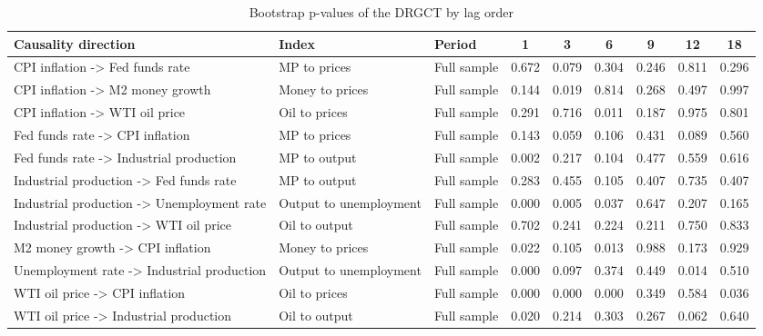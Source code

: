 \begin{table}[htbp]
\centering
\caption{Bootstrap p-values of the DRGCT by lag order}
\label{tab:macropvals}
\small
\begin{tabular}{lllcccccc}
\toprule
Causality direction & Index & Period & 1 & 3 & 6 & 9 & 12 & 18 \\
\midrule
CPI inflation -> Fed funds rate & MP to prices & Full sample & 0.672 & 0.079 & 0.304 & 0.246 & 0.811 & 0.296 \\
CPI inflation -> M2 money growth & Money to prices & Full sample & 0.144 & 0.019 & 0.814 & 0.268 & 0.497 & 0.997 \\
CPI inflation -> WTI oil price & Oil to prices & Full sample & 0.291 & 0.716 & 0.011 & 0.187 & 0.975 & 0.801 \\
Fed funds rate -> CPI inflation & MP to prices & Full sample & 0.143 & 0.059 & 0.106 & 0.431 & 0.089 & 0.560 \\
Fed funds rate -> Industrial production & MP to output & Full sample & 0.002 & 0.217 & 0.104 & 0.477 & 0.559 & 0.616 \\
Industrial production -> Fed funds rate & MP to output & Full sample & 0.283 & 0.455 & 0.105 & 0.407 & 0.735 & 0.407 \\
Industrial production -> Unemployment rate & Output to unemployment & Full sample & 0.000 & 0.005 & 0.037 & 0.647 & 0.207 & 0.165 \\
Industrial production -> WTI oil price & Oil to output & Full sample & 0.702 & 0.241 & 0.224 & 0.211 & 0.750 & 0.833 \\
M2 money growth -> CPI inflation & Money to prices & Full sample & 0.022 & 0.105 & 0.013 & 0.988 & 0.173 & 0.929 \\
Unemployment rate -> Industrial production & Output to unemployment & Full sample & 0.000 & 0.097 & 0.374 & 0.449 & 0.014 & 0.510 \\
WTI oil price -> CPI inflation & Oil to prices & Full sample & 0.000 & 0.000 & 0.000 & 0.349 & 0.584 & 0.036 \\
WTI oil price -> Industrial production & Oil to output & Full sample & 0.020 & 0.214 & 0.303 & 0.267 & 0.062 & 0.640 \\
\bottomrule
\end{tabular}
\end{table}
